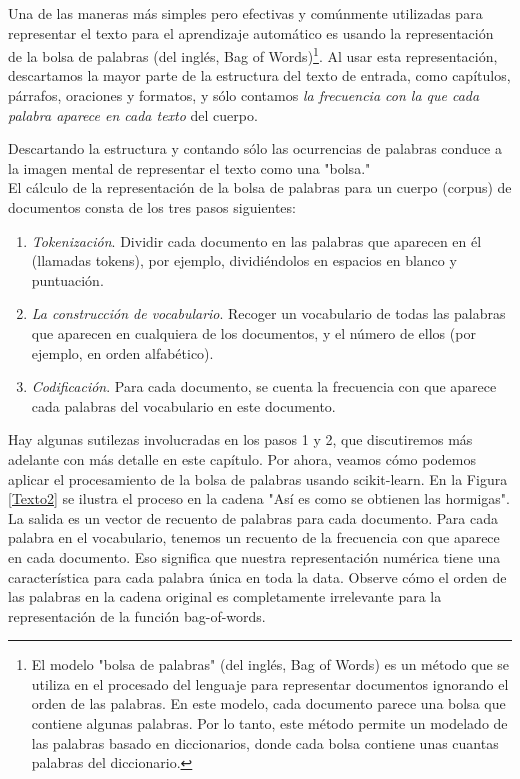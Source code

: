 Una de las maneras más simples pero efectivas y comúnmente utilizadas para representar el texto para el aprendizaje automático es usando  la representación de la bolsa de palabras (del inglés, Bag of Words)\footnote{El modelo "bolsa de palabras" (del inglés, Bag of Words) es un método que se utiliza en el procesado del lenguaje para representar documentos ignorando el orden de las palabras. En este modelo, cada documento parece una bolsa que contiene algunas palabras. Por lo tanto, este método permite un modelado de las palabras basado en diccionarios, donde cada bolsa contiene unas cuantas palabras del diccionario.}. Al usar esta representación, descartamos la mayor parte de la estructura del texto de entrada, como capítulos, párrafos, oraciones y formatos, y sólo contamos {\emph{la frecuencia con la que cada palabra aparece en cada texto}}  del cuerpo.

 Descartando la estructura y contando sólo las ocurrencias de palabras conduce a la imagen mental de representar el texto como una "{}bolsa."{}  \\
 
  El cálculo de la representación de la bolsa de palabras para un cuerpo (corpus) de documentos consta de los tres pasos siguientes:
  
\begin{enumerate}
	
	\item \emph{Tokenización}. Dividir cada documento en las palabras que aparecen en él (llamadas tokens), por ejemplo, dividiéndolos en espacios en blanco y puntuación.
	
	\item \emph{La construcción de vocabulario}. Recoger un vocabulario de todas las palabras que aparecen en cualquiera de los documentos, y el número de ellos (por ejemplo, en orden alfabético). 
	
	\item \emph{Codificación}. Para cada documento, se cuenta la frecuencia   con   que  aparece cada palabras del vocabulario en este documento.
	
\end{enumerate}

Hay algunas sutilezas involucradas en los pasos 1 y 2, que discutiremos   más adelante con más detalle  en este capítulo. Por ahora, veamos cómo podemos aplicar el procesamiento de la bolsa de palabras usando {\ttfamily scikit-learn}. En la Figura \ref{Texto2} se ilustra el proceso en la cadena "{}Así es como se obtienen las hormigas{}". La salida es un vector de recuento de palabras para cada documento. 
Para cada palabra en el vocabulario, tenemos un recuento de la frecuencia con que aparece en cada documento. Eso significa que nuestra representación numérica tiene una característica para cada palabra única en toda la data. Observe cómo el orden de las palabras en la cadena original es completamente irrelevante para la representación de la función bag-of-words.

